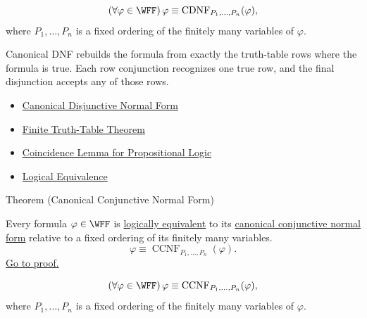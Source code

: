 \begin{remark*}
\[
(\forall\varphi\in\WFF)\,
\varphi\equiv \mathrm{CDNF}_{P_1,\ldots,P_n}(\varphi),
\]
where \(P_1,\ldots,P_n\) is a fixed ordering of the finitely many variables of
\(\varphi\).
\end{remark*}

\begin{remark*}[Interpretation]
Canonical DNF rebuilds the formula from exactly the truth-table rows where the
formula is true. Each row conjunction recognizes one true row, and the final
disjunction accepts any of those rows.
\end{remark*}

\begin{dependencies}
\begin{itemize}
  \item \hyperref[def:canonical-disjunctive-normal-form-propositional-logic]{Canonical Disjunctive Normal Form}
  \item \hyperref[thm:finite-truth-table-propositional-logic]{Finite Truth-Table Theorem}
  \item \hyperref[lem:coincidence-lemma-propositional-logic]{Coincidence Lemma for Propositional Logic}
  \item \hyperref[def:logical-equivalence-propositional-logic]{Logical Equivalence}
\end{itemize}
\end{dependencies}

\begin{theorembox}{Theorem (Canonical Conjunctive Normal Form)}
\begin{theorem}
\label{thm:canonical-conjunctive-normal-form-propositional-logic}
Every formula \(\varphi\in\WFF\) is
\hyperref[def:logical-equivalence-propositional-logic]{logically equivalent}
to its
\hyperref[def:canonical-conjunctive-normal-form-propositional-logic]{canonical conjunctive normal form}
relative to a fixed ordering of its finitely many variables.
\[
\varphi\equiv \operatorname{CCNF}_{P_1,\ldots,P_n}(\varphi).
\]
\noindent\hyperref[prf:canonical-conjunctive-normal-form-propositional-logic]{Go to proof.}
\end{theorem}
\end{theorembox}

\begin{remark*}
\[
(\forall\varphi\in\WFF)\,
\varphi\equiv \mathrm{CCNF}_{P_1,\ldots,P_n}(\varphi),
\]
where \(P_1,\ldots,P_n\) is a fixed ordering of the finitely many variables of
\(\varphi\).
\end{remark*}

